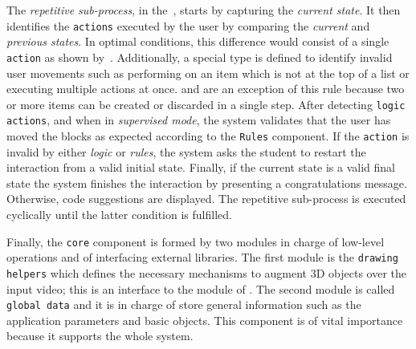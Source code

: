 The \emph{repetitive sub\hyp{}process}, in
the~, starts by capturing the \emph{current
  state}. It then identifies the \texttt{actions} executed by the user
by comparing the \emph{current} and \emph{previous states}. In optimal
conditions, this difference would consist of a single \texttt{action}
as shown by~. Additionally, a special type is
defined to identify invalid user movements such as performing \pop on
an item which is not at the top of a list or executing multiple
actions at once. \create and \discard are an exception of this rule
because two or more items can be created or discarded in a single
step. After detecting \texttt{logic actions}, and when in
\emph{supervised mode}, the system validates that the user has moved
the blocks as expected according to the \texttt{Rules} component. If
the \texttt{action} is invalid by either \emph{logic} or \emph{rules},
the system asks the student to restart the interaction from a valid
initial state. Finally, if the current state is a valid final state
the system finishes the interaction by presenting a congratulations
message. Otherwise, \erlang code suggestions are displayed. The
repetitive sub\hyp{}process is executed cyclically until the latter
condition is fulfilled.

Finally, the \texttt{core} component is formed by two modules in
charge of low\hyp{}level operations and of interfacing external
libraries. The first module is the \texttt{drawing helpers} which
defines the necessary mechanisms to augment 3D objects over the input
video; this is an interface to the \osg module of \osgart. The second
module is called \texttt{global data} and it is in charge of store
general information such as the application parameters and \osgart
basic objects. This component is of vital importance because it
supports the whole system.
